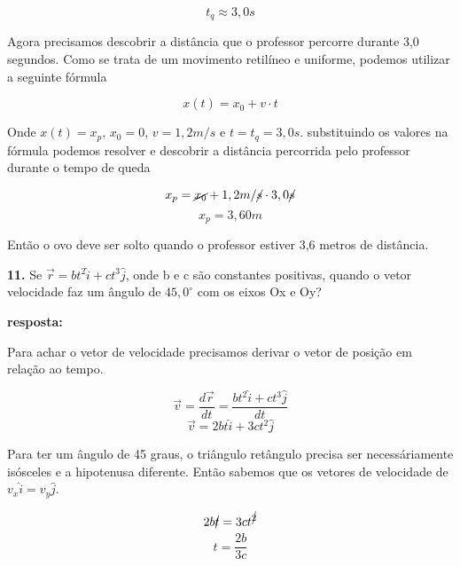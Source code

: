 \documentclass[a4paper, 12pt]{article}
\begin{document}
\begin{flushleft}
		\begin{equation*}
			t_q \approx 3,0s
		\end{equation*}
		
		Agora precisamos descobrir a distância que o professor percorre durante 3,0 segundos. Como se trata de um movimento retilíneo e uniforme, podemos utilizar a seguinte fórmula
		
		\begin{equation*}
			x(t) = x_0 + v \cdot t
		\end{equation*}
		
		Onde $x(t) = x_p$, $x_0 = 0$, $v = 1,2m/s$ e $t = t_q = 3,0s$. substituindo os valores na fórmula podemos resolver e descobrir a distância percorrida pelo professor durante o tempo de queda
		
		\begin{equation*}
			x_p = \cancel{x_0} + 1,2m/\cancel{s} \cdot 3,0\cancel{s} 
		\end{equation*}
		\begin{equation*}
			x_p = 3,60m 
		\end{equation*}
		
		Então o ovo deve ser solto quando o professor estiver 3,6 metros de distância.
		
		\vspace{2em}
		
		\textbf{11.} Se $\vec{r} = bt^2 \hat{i} + c t^3 \hat{j}$, onde b e c são constantes positivas, quando o vetor velocidade faz um ângulo de $45,0^\circ$ com os eixos Ox e Oy?
		
		\textbf{resposta:}
		
		Para achar o vetor de velocidade precisamos derivar o vetor de posição em relação ao tempo.
		
		\begin{equation*}
			\vec{v} = \dfrac{d\vec{r}}{dt} = \dfrac{bt^2\hat{i} + ct^3\hat{j}}{dt}
		\end{equation*}
		\begin{equation*}
			\vec{v} = 2bt\hat{i} + 3ct^2\hat{j}
		\end{equation*}
		
		Para ter um ângulo de 45 graus, o triângulo retângulo precisa ser necessáriamente isósceles e a hipotenusa diferente. Então sabemos que os vetores de velocidade de $v_x\hat{i} = v_y\hat{j}$.
		
		\begin{equation*}
			2b\cancel{t} = 3ct^{\cancel{2}}
		\end{equation*}
		\begin{equation*}
			t = \frac{2b}{3c}
		\end{equation*}
		

\end{flushleft}
\end{document}
